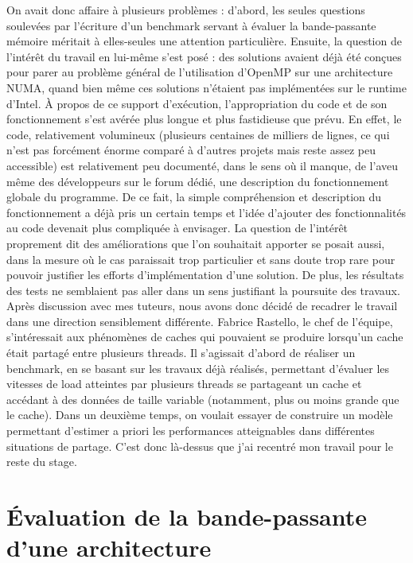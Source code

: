\documentclass{report}
\begin{document}
On avait donc affaire à plusieurs problèmes : d'abord, les seules questions soulevées par l'écriture d'un
benchmark servant à évaluer la bande-passante mémoire méritait à elles-seules une attention particulière.
Ensuite, la question de l'intérêt du travail en lui-même s'est posé : des solutions avaient déjà été 
conçues pour parer au problème général de l'utilisation d'OpenMP sur une architecture NUMA, quand bien
même ces solutions n'étaient pas implémentées sur le runtime d'Intel. À propos de ce support d'exécution,
l'appropriation du code et de son fonctionnement s'est avérée plus longue et plus fastidieuse que prévu.
En effet, le code, relativement volumineux (plusieurs centaines de milliers de lignes, ce qui n'est pas
forcément énorme comparé à d'autres projets mais reste assez peu accessible) est relativement peu documenté,
dans le sens où il manque, de l'aveu même des développeurs sur le forum dédié, une description du 
fonctionnement globale du programme. De ce fait, la simple compréhension et description du fonctionnement
a déjà pris un certain temps et l'idée d'ajouter des fonctionnalités au code devenait plus compliquée à
envisager. La question de l'intérêt proprement dit des améliorations que l'on souhaitait apporter se posait
aussi, dans la mesure où le cas paraissait trop particulier et sans doute trop rare pour pouvoir justifier
les efforts d'implémentation d'une solution. De plus, les résultats des tests ne semblaient pas aller dans 
un sens justifiant la poursuite des travaux.
\\Après discussion avec mes tuteurs, nous avons donc décidé de recadrer le travail dans une direction 
sensiblement différente. Fabrice Rastello, le chef de l'équipe, s'intéressait aux phénomènes de caches
qui pouvaient se produire lorsqu'un cache était partagé entre plusieurs threads. Il s'agissait d'abord
de réaliser un benchmark, en se basant sur les travaux déjà réalisés, permettant d'évaluer les vitesses
de load atteintes par plusieurs threads se partageant un cache et accédant à des données de taille 
variable (notamment, plus ou moins grande que le cache). Dans un deuxième temps, on voulait essayer de
construire un modèle permettant d'estimer a priori les performances atteignables dans différentes 
situations de partage. C'est donc là-dessus que j'ai recentré mon travail pour le reste du stage.


\chapter{Évaluation de la bande-passante d'une architecture}
\end{document}
